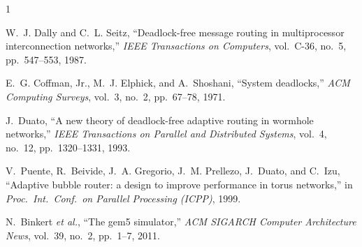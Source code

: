 \documentclass[10pt,journal,compsoc]{IEEEtran}
\begin{document}
\begin{thebibliography}{1}

W.~J. Dally and C.~L. Seitz, ``Deadlock-free message routing in multiprocessor interconnection networks,'' \emph{IEEE Transactions on Computers}, vol.~C-36, no.~5, pp.~547--553, 1987.

E.~G. Coffman, Jr., M.~J. Elphick, and A.~Shoshani, ``System deadlocks,'' \emph{ACM Computing Surveys}, vol.~3, no.~2, pp.~67--78, 1971.

J.~Duato, ``A new theory of deadlock-free adaptive routing in wormhole networks,'' \emph{IEEE Transactions on Parallel and Distributed Systems}, vol.~4, no.~12, pp.~1320--1331, 1993.

V.~Puente, R.~Beivide, J.~A. Gregorio, J.~M. Prellezo, J.~Duato, and C.~Izu, ``Adaptive bubble router: a design to improve performance in torus networks,'' in \emph{Proc.\ Int.\ Conf.\ on Parallel Processing (ICPP)}, 1999.

N.~Binkert \emph{et al.}, ``The gem5 simulator,'' \emph{ACM SIGARCH Computer Architecture News}, vol.~39, no.~2, pp.~1--7, 2011.

\end{thebibliography}
\end{document}
